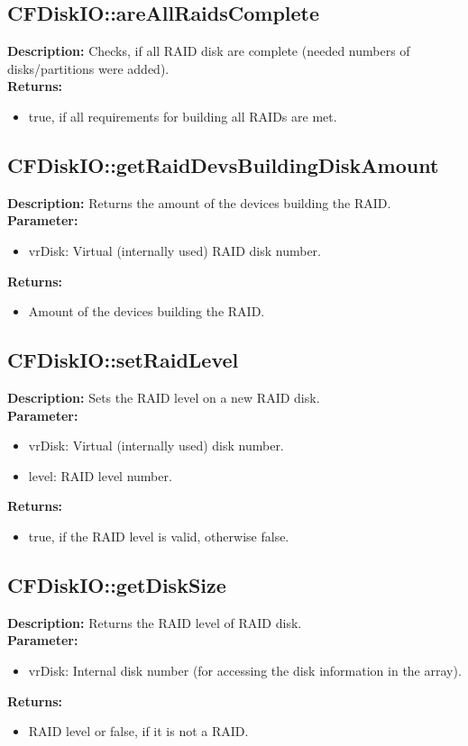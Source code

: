 \subsection{CFDiskIO::areAllRaidsComplete}
\textbf{Description:} Checks, if all RAID disk are complete (needed numbers of disks/partitions were added).\\
\textbf{Returns:}
\begin{itemize}
\item true, if all requirements for building all RAIDs are met.
\end{itemize}

\subsection{CFDiskIO::getRaidDevsBuildingDiskAmount}
\textbf{Description:} Returns the amount of the devices building the RAID.\\
\textbf{Parameter:}
\begin{itemize}
\item vrDisk: Virtual (internally used) RAID disk number.
\end{itemize}
\textbf{Returns:}
\begin{itemize}
\item Amount of the devices building the RAID.
\end{itemize}

\subsection{CFDiskIO::setRaidLevel}
\textbf{Description:} Sets the RAID level on a new RAID disk.\\
\textbf{Parameter:}
\begin{itemize}
\item vrDisk: Virtual (internally used) disk number.
\item level: RAID level number.
\end{itemize}
\textbf{Returns:}
\begin{itemize}
\item true, if the RAID level is valid, otherwise false.
\end{itemize}

\subsection{CFDiskIO::getDiskSize}
\textbf{Description:} Returns the RAID level of RAID disk.\\
\textbf{Parameter:}
\begin{itemize}
\item vrDisk: Internal disk number (for accessing the disk information in the array).
\end{itemize}
\textbf{Returns:}
\begin{itemize}
\item RAID level or false, if it is not a RAID.
\end{itemize}

